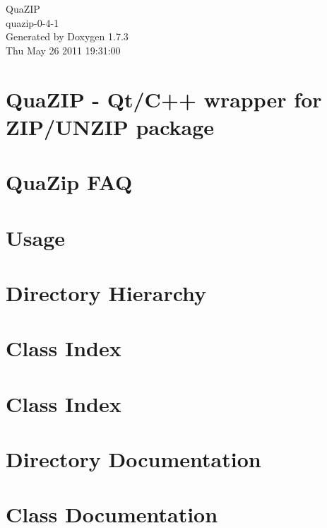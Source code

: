 \documentclass[a4paper]{book}
\begin{document}
\begin{titlepage}
\vspace*{7cm}
\begin{center}
{\Large QuaZIP \\[1ex]\large quazip-\/0-\/4-\/1 }\\
\vspace*{1cm}
{\large Generated by Doxygen 1.7.3}\\
\vspace*{0.5cm}
{\small Thu May 26 2011 19:31:00}\\
\end{center}
\end{titlepage}
\clearemptydoublepage
{}
\tableofcontents
\clearemptydoublepage
{}
\chapter{QuaZIP -\/ Qt/C++ wrapper for ZIP/UNZIP package}
\label{index}
\chapter{QuaZip FAQ}
\label{faq}

\chapter{Usage}
\label{usage}

\chapter{Directory Hierarchy}

\chapter{Class Index}

\chapter{Class Index}

\chapter{Directory Documentation}






\chapter{Class Documentation}










\printindex
\end{document}
